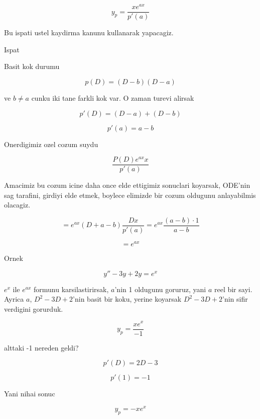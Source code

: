 \documentclass[12pt,fleqn]{article}
\begin{document}
\[ y_p = \frac{x e^{ax}}{p'(a)} \]

Bu ispati ustel kaydirma kanunu kullanarak yapacagiz. 

Ispat

Basit kok durumu

\[ p(D) = (D-b)(D-a) \]

ve $b \ne a$ cunku iki tane farkli kok var. O zaman turevi alirsak

\[ p'(D) = (D-a) + (D-b) \]

\[ p'(a) = a-b \]

Onerdigimiz ozel cozum suydu

\[ \frac{P(D) e^{ax} x}{p'(a)} \]

Amacimiz bu cozum icine daha once elde ettigimiz sonuclari koyarsak,
ODE'nin sag tarafini, girdiyi elde etmek, boylece elimizde bir cozum
oldugunu anlayabilmis olacagiz. 

\[ = e^{ax}(D+a-b)\frac{Dx}{p'(a)} = e^{ax} \frac{(a-b) \cdot 1}{a-b} \]

\[ = e^{ax} \]

Ornek

\[ y'' - 3y + 2y = e^x \]

$e^x$ ile $e^{ax}$ formunu karsilastirirsak, $a$'nin 1 oldugunu goruruz,
yani $a$ reel bir sayi. Ayrica $a$, $D^2-3D+2$'nin basit bir koku, yerine
koyarsak $D^2-3D+2$'nin sifir verdigini gorurduk. 

\[ y_p = \frac{xe^x}{-1} \]

alttaki -1 nereden geldi? 

\[ p'(D) = 2D - 3 \]

\[ p'(1) = -1 \]

Yani nihai sonuc

\[ y_p = -xe^x \]
\end{document}
